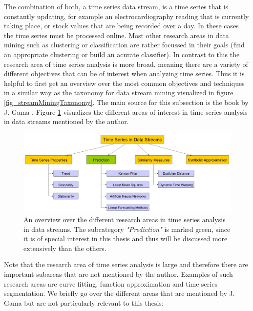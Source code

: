 The combination of both, a time series data stream, is a time series that is constantly updating, for example an electrocardiography reading that is currently taking place, or stock values that are being recorded over a day. In these cases the time series must be processed online. \newline
Most other research areas in data mining such as clustering or classification are rather focussed in their goals (find an appropriate clustering or build an acurate classifier). In contrast to this the research area of time series analysis is more broad, meaning there are a variety of different objectives that can be of interest when analyzing time series. Thus it is helpful to first get an overview over the most common objectives and techniques in a similar way as the taxonomy for data stream mining visualized in figure \ref{fig_streamMiningTaxonomy}. The main source for this subsection is the book by J. Gama \cite{gama2010knowledge}. Figure \ref{fig_timeSeriesInDataStreamsOverview} visualizes the different areas of interest in time series analysis in data streams mentioned by the author.

\begin{figure}[h]
	\centering
  	\includegraphics[width=\textwidth]{timeSeriesInDataStreamsOverview}
	\caption{An overview over the different research areas in time series analysis in data streams. The subcategory \textit{"Prediction"} is marked green, since it is of special interest in this thesis and thus will be discussed more extensively than the others.}
	\label{fig_timeSeriesInDataStreamsOverview}
\end{figure}

Note that the research area of time series analysis is large and therefore there are important subareas that are not mentioned by the author. Examples of such research areas are curve fitting, function approximation and time series segmentation. We briefly go over the different areas that are mentioned by J. Gama but are not particularly relevant to this thesis:

